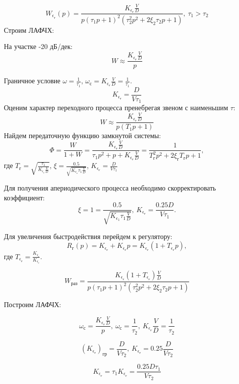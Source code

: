 \documentclass{article}
\begin{document}
\[
	W_{\epsilon_\text{г}}(p)= \frac{K_{\epsilon_\text{г}}
		\frac{V}{D}}{p(\tau_{1}p + 1)^2 ( \tau_2^2 p^2 + 2 \xi_2 \tau_2 p + 1 )}, \
	\tau_1 > \tau_2
\]
Строим ЛАФЧХ:
\begin{figure}[H]
	\centering
	\label{fig:fig_69}
\end{figure}
На участке -20 дБ/дек:
\[
	W \approx \frac{K_{\epsilon_\text{г}} \frac{V}{D}}{p}
\]

Граничное условие $\omega = \frac{1}{\tau_1}$, $\omega_\text{с} =
	K_{\epsilon_\text{г}} \frac{V}{D} = \frac{1}{\tau_1}$.
\[
	K_{\epsilon_\text{г}} = \frac{D}{V \tau_1}
\]
Оценим характер переходного процесса пренебрегая звеном с наименьшим $\tau$:
\[
	W \approx \frac{K_{\epsilon_\text{г}} \frac{V}{D}}{p (T_1 p + 1)}
\]
Найдем передаточную функцию замкнутой системы:
\[
	\Phi = \frac{W}{1 + W} = \frac{K_{\epsilon_\text{г}} \frac{V}{D}}{\tau_1
		p^2 + p + K_{\epsilon_\text{г}} \frac{V}{D}}= \frac{1}{ T_\text{г}^2 p^2 +
		2 \xi_\text{г} T_\text{г} p + 1 },
\]
где $T_\text{г} = \sqrt{ \frac{\tau_1}{K_{\epsilon_\text{г}} \frac{V}{D}}}$,
$\xi = \frac{0.5}{\sqrt{K_{\epsilon_\text{г}} \tau_1 \frac{V}{D}}}$,
$K_{\epsilon_\text{г}} = \frac{D}{V \tau_1}$

Для получения апериодического процесса необходимо скорректировать коэффициент:
\[
	\xi = 1 = \frac{0.5}{\sqrt{K_{\epsilon_1} \tau_1 \frac{V}{D}}}, \
	K_{\epsilon_\text{г}} = \frac{ 0.25 D}{V \tau_1}.
\]


Для увеличения быстродействия перейдем к регулятору:
\[
	R_\text{г} (p) = K_{\epsilon_\text{г}} + K_{\dot{\epsilon}_\text{г}}p =
	K_{\epsilon_\text{г}}(1 + T_{\epsilon_\text{г}} p),
\]
где $T_{\epsilon_{\text{г}}} =
	\frac{K_{\dot{\epsilon}_{\text{г}}}}{K_{\epsilon_\text{г}}}$.

\[
	W_\text{раз} = \frac{K_{\epsilon_\text{г}}(1 +  T_{\epsilon_\text{г}} )
		\frac{V}{D}}{p(\tau_{1}p + 1)^2 ( \tau_2^2 p^2 + 2 \xi_2 \tau_2 p + 1 )}
\]

Построим ЛАФЧХ:
\begin{figure}[H]
	\centering
	\label{fig:fig_70}
\end{figure}

\[
	\omega_\text{с}   = \frac{K_{\epsilon_\text{г}} \frac{V}{D}}{p}, \
	\omega_\text{с} = \frac{1}{\tau_2}, \ K_{\epsilon_\text{г}} \frac{V}{D} =
	\frac{1}{\tau_2}
\]

\[
	(K_{\epsilon_\text{г}})_\text{гр} = \frac{D}{V \tau_2}, \
	K_{\epsilon_\text{г}} = 0.25 \frac{D}{V \tau_2}
\]

\[
	K_{\dot{\epsilon}_{\text{г}}} = \tau_1 K_{\epsilon_\text{г}} = \frac{0.25 D
		\tau_1}{V \tau_2}
\]
\end{document}
